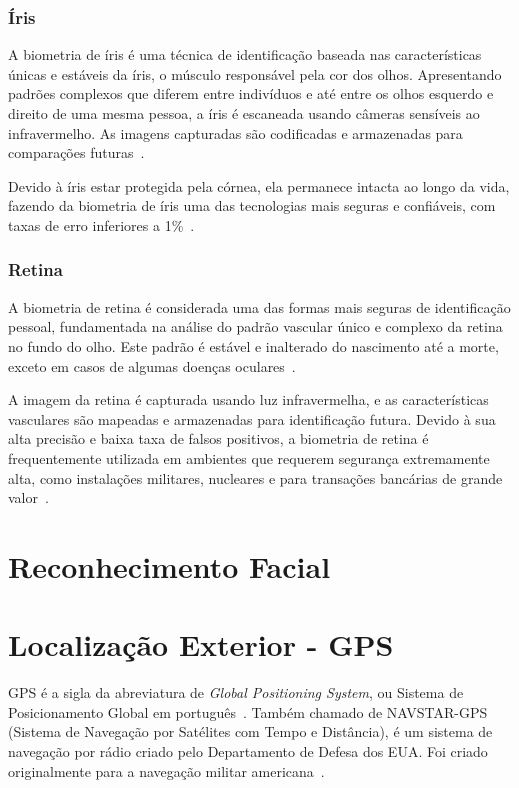 \subsubsection{Íris}\label{subsubsec:iris}
A biometria de íris é uma técnica de identificação baseada nas características únicas e estáveis da íris, o músculo responsável pela cor dos olhos.
Apresentando padrões complexos que diferem entre indivíduos e até entre os olhos esquerdo e direito de uma mesma pessoa, a íris é escaneada usando câmeras sensíveis ao infravermelho.
As imagens capturadas são codificadas e armazenadas para comparações futuras~\cite{de2020biometria}.

Devido à íris estar protegida pela córnea, ela permanece intacta ao longo da vida, fazendo da biometria de íris uma das tecnologias mais seguras e confiáveis, com taxas de erro inferiores a 1\%~\cite{de2020biometria}.

\subsubsection{Retina}\label{subsubsec:retina}
A biometria de retina é considerada uma das formas mais seguras de identificação pessoal, fundamentada na análise do padrão vascular único e complexo da retina no fundo do olho.
Este padrão é estável e inalterado do nascimento até a morte, exceto em casos de algumas doenças oculares~\cite{de2020biometria}.

A imagem da retina é capturada usando luz infravermelha, e as características vasculares são mapeadas e armazenadas para identificação futura.
Devido à sua alta precisão e baixa taxa de falsos positivos, a biometria de retina é frequentemente utilizada em ambientes que requerem segurança extremamente alta, como instalações militares, nucleares e para transações bancárias de grande valor~\cite{de2020biometria}.


\section{Reconhecimento Facial}\label{sec:reconhecimento-facial}


\section{Localização Exterior - GPS}\label{sec:localizacao}
GPS é a sigla da abreviatura de \textit{Global Positioning System}, ou Sistema de Posicionamento Global em português~\cite{gpsdesigning}.
Também chamado de NAVSTAR-GPS (Sistema de Navegação por Satélites com Tempo e Distância), é um sistema de navegação por rádio criado pelo Departamento de Defesa dos EUA. Foi criado originalmente para a navegação militar americana~\cite{novais2014localizaccao}.

